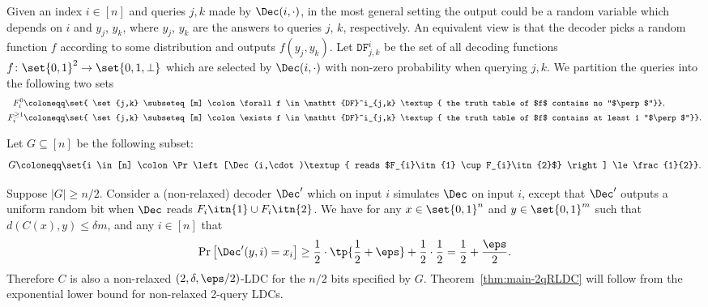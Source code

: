 Given an index $i \in [n]$ and queries $j,k$ made by $\Dec(i,\cdot)$, in the most general setting the output could be a random variable which depends on $i$ and $y_j$, $y_k$, where $y_j$, $y_k$ are the answers to queries $j$, $k$, respectively. An equivalent view is that the decoder picks a random function $f$ according to some distribution and outputs $f(y_j, y_k)$. Let $\mathtt{DF}^i_{j,k}$ be the set of all decoding functions $f \colon \set{0,1}^2 \rightarrow \set{0,1,\perp}$ which are selected by $\Dec(i,\cdot)$ with non-zero probability when querying $j,k$. We partition the queries into the following two sets
\begin{align*}
F_{i}^{0} &\coloneqq \set{ \set{j,k} \subseteq [m] \colon \forall f \in \mathtt{DF}^i_{j,k} \textup{ the truth table of $f$ contains no ``$\perp$''}}, \\
F_{i}^{\ge 1} &\coloneqq \set{ \set{j,k} \subseteq [m] \colon \exists f \in \mathtt{DF}^i_{j,k} \textup{ the truth table of $f$ contains at least 1 ``$\perp$''}}.
\end{align*}

\iffalse
\begin{definition}
	Let $G \subseteq [n]$ be the following subset:
	\begin{align*}
	G \coloneqq \set{i \in [n] \colon \Pr\left[\Dec(i,\cdot)\textup{ reads $F_{i}\itn{1} \cup F_{i}\itn{2}$} \right] \le \frac{1}{2}}.
	\end{align*}
\end{definition}

Suppose $|G| \ge n/2$. Consider a (non-relaxed) decoder $\Dec'$ which on input $i$ simulates $\Dec$ on input $i$, except that $\Dec'$ outputs a uniform random bit when $\Dec$ reads $F_{i}\itn{1} \cup F_{i}\itn{2}$. We have for any $x \in \set{0,1}^n$ and $y \in \set{0,1}^m$ such that $d(C(x), y) \le \delta m$, and any $i \in [n]$ that 
\begin{align*}
\Pr\left[ \Dec'(y, i) = x_i \right] \ge \frac{1}{2} \cdot \tp{\frac{1}{2} + \eps} + \frac{1}{2} \cdot \frac{1}{2} = \frac{1}{2} + \frac{\eps}{2}.
\end{align*}
Therefore $C$ is also a non-relaxed $(2,\delta,\eps/2)$-LDC for the $n/2$ bits specified by $G$. Theorem~\ref{thm:main-2qRLDC} will follow from the exponential lower bound for non-relaxed 2-query LDCs.

